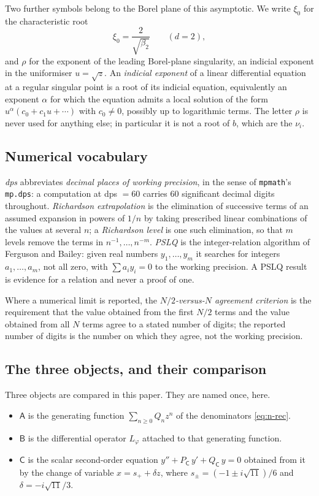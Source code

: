 Two further symbols belong to the Borel plane of this asymptotic. We write
$\xi_0$ for the characteristic root
\[
  \xi_0=\frac{2}{\sqrt{\beta_2}}\qquad(d=2),
\]
and $\rho$ for the exponent of the leading Borel-plane singularity, an indicial
exponent in the uniformiser $u=\sqrt z$. An \emph{indicial exponent} of a
linear differential equation at a regular singular point is a root of its
indicial equation, equivalently an exponent $\alpha$ for which the equation
admits a local solution of the form $u^{\alpha}(c_0+c_1u+\cdots)$ with
$c_0\neq0$, possibly up to logarithmic terms. The letter $\rho$ is never used
for anything else; in particular it is not a root of $b$, which are the
$\nu_i$.

\subsection{Numerical vocabulary}\label{ssec:numerics}

\emph{dps} abbreviates \emph{decimal places of working precision}, in the sense
of \texttt{mpmath}'s \texttt{mp.dps}: a computation at dps $=60$ carries $60$
significant decimal digits throughout. \emph{Richardson extrapolation} is the
elimination of successive terms of an assumed expansion in powers of $1/n$ by
taking prescribed linear combinations of the values at several $n$; a
\emph{Richardson level} is one such elimination, so that $m$ levels remove the
terms in $n^{-1},\dots,n^{-m}$. \emph{PSLQ} is the integer-relation algorithm
of Ferguson and Bailey: given real numbers $y_1,\dots,y_m$ it searches for
integers $a_1,\dots,a_m$, not all zero, with $\sum a_i y_i=0$ to the working
precision. A PSLQ result is evidence for a relation and never a proof of one.

Where a numerical limit is reported, the \emph{$N/2$-versus-$N$ agreement
criterion} is the requirement that the value obtained from the first $N/2$
terms and the value obtained from all $N$ terms agree to a stated number of
digits; the reported number of digits is the number on which they agree, not
the working precision.

\subsection{The three objects, and their comparison}\label{ssec:objects}

Three objects are compared in this paper. They are named once, here.

\begin{itemize}
\item \textbf{$\mathsf A$} is the generating function $\sum_{n\ge0}Q_nz^n$ of
  the denominators \eqref{eq:n-rec}.
\item \textbf{$\mathsf B$} is the differential operator $L_\varphi$ attached to
  that generating function.
\item \textbf{$\mathsf C$} is the scalar second-order equation
  $y''+P_{\mathsf C}\,y'+Q_{\mathsf C}\,y=0$ obtained from it by the change of
  variable $x=s_++\delta z$, where $s_\pm=(-1\pm i\sqrt{11})/6$ and
  $\delta=-i\sqrt{11}/3$.
\end{itemize}

